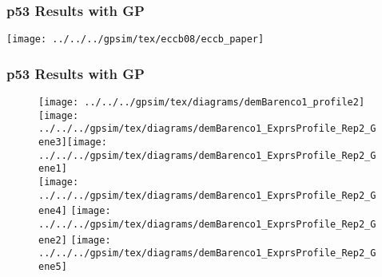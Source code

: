 \begin{frame}
\frametitle{p53 Results with GP}
  \texttt{[image: ../../../gpsim/tex/eccb08/eccb\_paper]}
\end{frame}

\begin{frame}
  \frametitle{p53 Results with GP}
  \begin{flushright}
    \textbf{\citep{Gao:latent08}}
  \end{flushright}
  \begin{figure}
    \centering{} 
    \texttt{[image: ../../../gpsim/tex/diagrams/demBarenco1\_profile2]}
    \hfill\texttt{[image: ../../../gpsim/tex/diagrams/demBarenco1\_ExprsProfile\_Rep2\_Gene3]}\hfill\texttt{[image: ../../../gpsim/tex/diagrams/demBarenco1\_ExprsProfile\_Rep2\_Gene1]}\\
    \texttt{[image: ../../../gpsim/tex/diagrams/demBarenco1\_ExprsProfile\_Rep2\_Gene4]}
    \hfill\texttt{[image: ../../../gpsim/tex/diagrams/demBarenco1\_ExprsProfile\_Rep2\_Gene2]}
    \hfill\texttt{[image: ../../../gpsim/tex/diagrams/demBarenco1\_ExprsProfile\_Rep2\_Gene5]} 
  \end{figure}
\end{frame}
